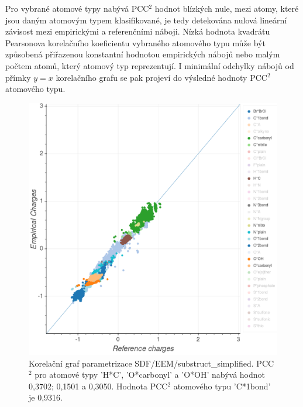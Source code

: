 Pro vybrané atomové typy nabývá PCC$^2$ hodnot blízkých nule, mezi atomy, které jsou daným atomovým typem klasifikované, je tedy detekována nulová lineární závisost mezi empirickými a referenčními náboji. Nízká hodnota kvadrátu Pearsonova korelačního koeficientu vybraného atomového typu může být způsobená přiřazenou konstantní hodnotou empirických nábojů nebo malým počtem atomů, který atomový typ reprezentují. I minimální odchylky nábojů od přímky $y = x$ korelačního grafu se pak projeví do výsledné hodnoty PCC$^2$ atomového typu.
\vspace{0,5cm}
\begin{figure}[h]
\begin{center}
\includegraphics[width=13cm]{pictures/graph_pcc_atom_types.png}
\caption{Korelační graf parametrizace SDF/EEM/substruct\_simplified. PCC$^2$ pro atomové typy 'H*C', 'O*carbonyl' a 'O*OH' nabývá hodnot 0,3702; 0,1501 a 0,3050. Hodnota PCC$^2$ atomového typu 'C*1bond' je 0,9316.}
\label{graph_pcc_atom_types}
\end{center}
\end{figure}

